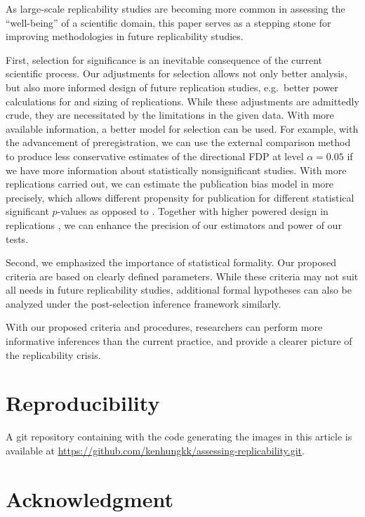 \documentclass[aoas, preprint]{imsart}
\theoremstyle{definition}
\theoremstyle{custom}
\begin{document}
  As large-scale replicability studies are becoming more common in assessing the ``well-being'' of a scientific domain, this paper serves as a stepping stone for improving methodologies in future replicability studies.

  First, selection for significance is an inevitable consequence of the current scientific process. Our adjustments for selection allows not only better analysis, but also more informed design of future replication studies, e.g.\ better power calculations for and sizing of replications. While these adjustments are admittedly crude, they are necessitated by the limitations in the given data. With more available information, a better model for selection can be used. For example, with the advancement of preregistration, we can use the external comparison method to produce less conservative estimates of the directional FDP at level $\alpha = 0.05$ if we have more information about statistically nonsignificant studies. With more replications carried out, we can estimate the publication bias model in \citet{Andrews:2018vh} more precisely, which allows different propensity for publication for different statistical significant $p$-values as opposed to . Together with higher powered design in replications \citep[e.g.][]{Camerer:2018de}, we can enhance the precision of our estimators and power of our tests.

  Second, we emphasized the importance of statistical formality. Our proposed criteria are based on clearly defined parameters. While these criteria may not suit all needs in future replicability studies, additional formal hypotheses can also be analyzed under the post-selection inference framework similarly.

  With our proposed criteria and procedures, researchers can perform more informative inferences than the current practice, and provide a clearer picture of the replicability crisis.

\section*{Reproducibility}

  A git repository containing with the code generating the images in this article is available at \url{https://github.com/kenhungkk/assessing-replicability.git}.

\section*{Acknowledgment}
\end{document}
